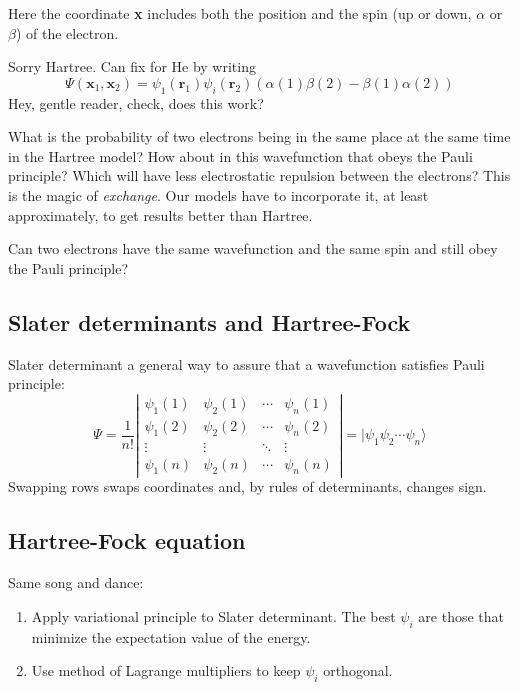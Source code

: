 \documentclass[11pt]{article}
\begin{document}
Here the coordinate \textbf{x} includes both the position and the spin (up or down, \(\alpha\) or \(\beta\)) of the electron.

Sorry Hartree.  Can fix for He by writing 
\[\Psi(\bm{x}_1,\bm{x}_2) = \psi_1(\bm{r}_1)\psi_i(\bm{r}_2)\left(\alpha(1)\beta(2) - \beta(1)\alpha(2)\right) \]
Hey, gentle reader, check, does this work?  

What is the probability of two electrons being in the same place at the same time in the Hartree model?  How about in this wavefunction that obeys the Pauli principle?  Which will have less electrostatic repulsion between the electrons?  This is the magic of \emph{exchange}.  Our models have to incorporate it, at least approximately, to get results better than Hartree.

Can two electrons have the same wavefunction and the same spin and still obey the Pauli principle?
\subsection{Slater determinants and Hartree-Fock}
\label{sec:org420d019}
Slater determinant a general way to assure that a wavefunction satisfies Pauli principle:
\[ \Psi = \frac{1}{n!}\left | \begin{array}{cccc}
\psi_1(1) & \psi_2(1) & \cdots & \psi_n(1) \\
\psi_1(2) & \psi_2(2) & \cdots & \psi_n(2) \\
\vdots & \vdots & \ddots & \vdots \\
\psi_1(n) & \psi_2(n) & \cdots & \psi_n(n) \end{array} \right | = |\psi_1\psi_2\cdots\psi_n\rangle \]
Swapping rows swaps coordinates and, by rules of determinants, changes sign.

\subsection{Hartree-Fock equation}
\label{sec:orgdb4c895}
Same song and dance:
\begin{enumerate}
\item Apply variational principle to Slater determinant. The best \(\psi_i\) are those that minimize the expectation value of the energy.
\item Use method of Lagrange multipliers to keep \(\psi_i\) orthogonal.
\end{enumerate}
\end{document}
